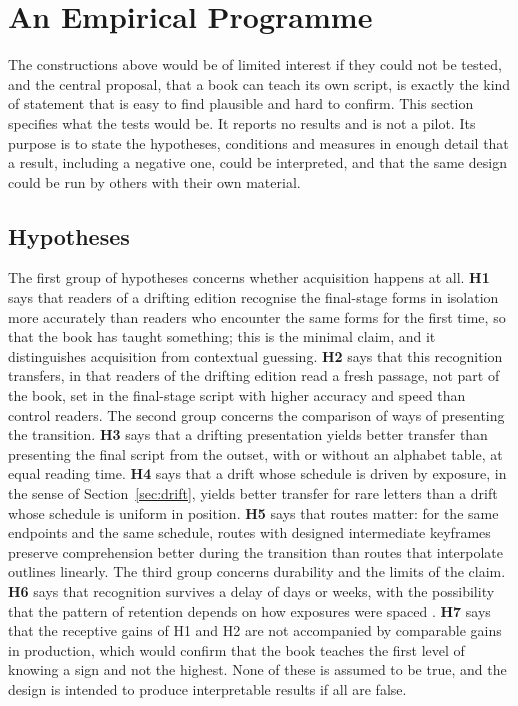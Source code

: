 \section{An Empirical Programme}\label{sec:empirical}

The constructions above would be of limited interest if they could not be tested, and the central proposal, that a book can teach its own script, is exactly the kind of statement that is easy to find plausible and hard to confirm. This section specifies what the tests would be. It reports no results and is not a pilot. Its purpose is to state the hypotheses, conditions and measures in enough detail that a result, including a negative one, could be interpreted, and that the same design could be run by others with their own material.

\subsection{Hypotheses}

The first group of hypotheses concerns whether acquisition happens at all. \textbf{H1} says that readers of a drifting edition recognise the final-stage forms in isolation more accurately than readers who encounter the same forms for the first time, so that the book has taught something; this is the minimal claim, and it distinguishes acquisition from contextual guessing. \textbf{H2} says that this recognition transfers, in that readers of the drifting edition read a fresh passage, not part of the book, set in the final-stage script with higher accuracy and speed than control readers. The second group concerns the comparison of ways of presenting the transition. \textbf{H3} says that a drifting presentation yields better transfer than presenting the final script from the outset, with or without an alphabet table, at equal reading time. \textbf{H4} says that a drift whose schedule is driven by exposure, in the sense of Section~\ref{sec:drift}, yields better transfer for rare letters than a drift whose schedule is uniform in position. \textbf{H5} says that routes matter: for the same endpoints and the same schedule, routes with designed intermediate keyframes preserve comprehension better during the transition than routes that interpolate outlines linearly. The third group concerns durability and the limits of the claim. \textbf{H6} says that recognition survives a delay of days or weeks, with the possibility that the pattern of retention depends on how exposures were spaced \citep{cepeda2006,bjork1994}. \textbf{H7} says that the receptive gains of H1 and H2 are not accompanied by comparable gains in production, which would confirm that the book teaches the first level of knowing a sign and not the highest. None of these is assumed to be true, and the design is intended to produce interpretable results if all are false.

